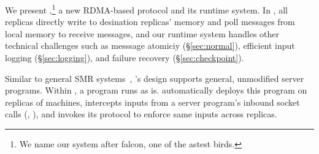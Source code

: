 We present \xxx,\footnote{We name our system after
falcon, one of the astest birds.} a new RDMA-based \paxos protocol and its
runtime system. In \xxx, all replicas directly write to desination
replicas' memory and poll messages from local memory to receive messages, and 
our runtime system handles other technical challenges such as messsage 
atomiciy (\S\ref{sec:normal}), efficient input logging (\S\ref{sec:logging}), 
and failure recovery (\S\ref{sec:checkpoint}).

Similar to general SMR systems~\cite{rex:eurosys14,crane:sosp15},
\xxx's design supports general, unmodified server programs. Within \xxx, a
program runs as is. \xxx automatically deploys this program on replicas
of machines, intercepts inputs from a server program's 
inbound socket calls (\eg, \recv), and invokes its \paxos protocol to enforce 
same inputs across replicas.






%



